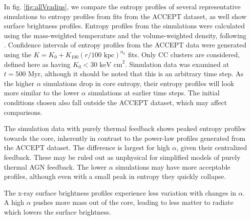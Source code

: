 \documentclass[iop,apjl, twocolappendix]{emulateapj}   %
\begin{document}
In fig. \ref{fig:allVradius}, we compare the entropy profiles of several
representative simulations to entropy profiles from fits from the ACCEPT
dataset, as well show surface brightness profiles. Entropy profiles from the
simulations were calculated using the mass-weighted temperature and the
volume-weighted density, following \citep{}. Confidence intervals of entropy
profiles from the ACCEPT data were generated using the $K = K_0 + K_{100} \left
( r/100 \text{ kpc} \right )^{\alpha_k}$ fits. Only CC clusters are
considered, defined here as having $K_0 < 30 \text{ keV cm}^2$. Simulation data
was examined at $t = 500 \text{ Myr}$, although it should be noted that this is
an arbitrary time step. As the higher $\alpha$ simulations drop in core
entropy, their entropy profiles will look more similar to the lower $\alpha$
simulations at earlier time steps. The initial conditions chosen also fall
outside the ACCEPT dataset, which may affect comparisons.

The simulation data with purely thermal feedback shows peaked entropy profiles
towards the core, inherently in contrast to the power-law profiles generated
from the ACCEPT dataset. The difference is largest for high $\alpha$, given
their centralized feedback. These may be ruled out as unphysical for
simplified models of purely thermal AGN feedback.  The lower $\alpha$
simulations may have more acceptable profiles, although even with a small peak
in entropy they quickly collapse.

The x-ray surface brightness profiles experience less variation with changes in
$\alpha$. A high $\alpha$ pushes more mass out of the core, leading to less
matter to radiate which lowers the surface brightness.
\end{document}
